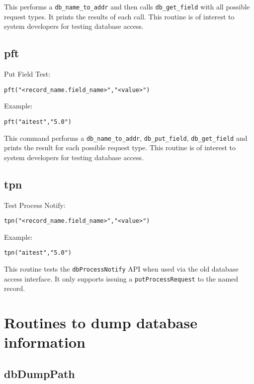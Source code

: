 This performs a \verb|db_name_to_addr| and then calls \verb|db_get_field| with all possible request types. It prints the results 
of each call. This routine is of interest to system developers for testing database access.

\subsection{pft}

Put Field Test:

\begin{verbatim}
pft("<record_name.field_name>","<value>")
\end{verbatim}

Example:

\begin{verbatim}
pft("aitest","5.0")
\end{verbatim}

This command performs a \verb|db_name_to_addr|, \verb|db_put_field|, \verb|db_get_field| and prints the result for each 
possible request type. This routine is of interest to system developers for testing database access.

\subsection{tpn}

Test Process Notify:

\begin{verbatim}
tpn("<record_name.field_name>","<value>")
\end{verbatim}

Example:

\begin{verbatim}
tpn("aitest","5.0")
\end{verbatim}

This routine tests the \verb|dbProcessNotify| API when used via the old database access interface.
It only supports issuing a \verb|putProcessRequest| to the named record.

\section{Routines to dump database information}

\subsection{dbDumpPath}

